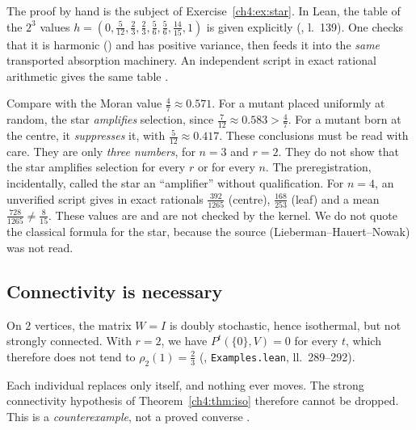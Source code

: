 The proof by hand is the subject of Exercise~\ref{ch4:ex:star}. In Lean, the table of the $2^3$ values
$h=(0,\frac5{12},\frac23,\frac23,\frac56,\frac56,\frac{14}{15},1)$ is given explicitly (, l.~139).
One checks that it is harmonic () and has positive variance, then feeds it into the
\emph{same} transported absorption machinery. An independent script in exact rational arithmetic gives the same table
\tierX.

\begin{physbox}
\tierC{} Compare with the Moran value $\frac47\approx0.571$. For a mutant placed uniformly at random, the star
\emph{amplifies} selection, since $\frac7{12}\approx0.583>\frac47$. For a mutant born at the centre, it
\emph{suppresses} it, with $\frac5{12}\approx0.417$. These conclusions must be read with care. They are only
\emph{three numbers}, for $n=3$ and $r=2$. They do not show that the star amplifies selection for every $r$ or
for every $n$. The preregistration, incidentally, called the star an ``amplifier'' without qualification. For $n=4$,
an unverified script gives in exact rationals $\frac{392}{1265}$ (centre), $\frac{168}{253}$ (leaf) and a
mean $\frac{728}{1265}\ne\frac8{15}$. These values are \tierX{} and are not checked by the
kernel. We do not quote the classical formula for the star, because the source (Lieberman--Hauert--Nowak) was not
read.
\end{physbox}

\subsection{Connectivity is necessary}
\begin{proposition}\label{ch4:prop:identite}
On $2$ vertices, the matrix $W=I$ is doubly stochastic, hence isothermal, but not strongly connected. With
$r=2$, we have $P^t(\{0\},V)=0$ for every $t$, which therefore does not tend to $\rho_2(1)=\frac23$
(, \texttt{Examples.lean}, ll.~289--292).
\end{proposition}
Each individual replaces only itself, and nothing ever moves. The strong connectivity hypothesis of
Theorem~\ref{ch4:thm:iso} therefore cannot be dropped. This is a \emph{counterexample}, not a proved
converse \tierC.

